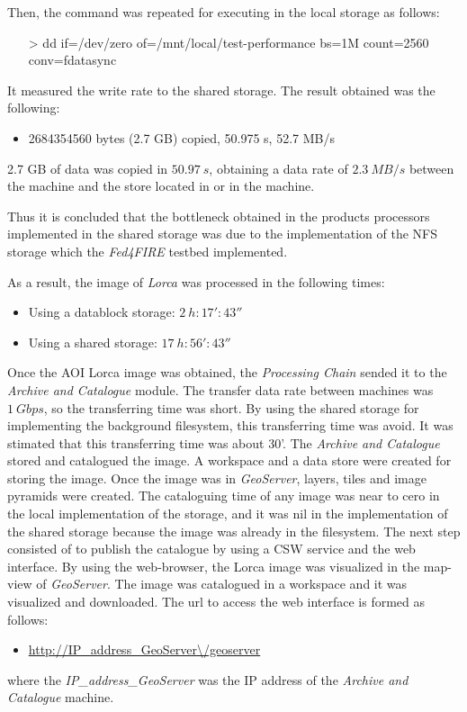 Then, the command was repeated for executing in the local storage as follows:
\begin{itemize}
\item[>] dd if=/dev/zero of=/mnt/local/test-performance bs=1M count=2560
  conv=fdatasync
\end{itemize}

It measured the write rate to the shared storage. The result obtained was the
following:
\begin{itemize}
\item 2684354560 bytes (2.7 GB) copied, 50.975 s, 52.7 MB/s
\end{itemize}
2.7 GB of data was copied in $50.97~s$, obtaining a data rate  of $2.3~MB/s$ between the \bonfire machine and
the store located in  \bonfire or in the machine.

Thus it is concluded that the bottleneck obtained in the products processors
implemented in the shared storage was due to the implementation of the \ac{NFS}
storage which the
\emph{Fed4FIRE} testbed implemented.

As a result, the image of \emph{Lorca} was processed in the following
times:
\begin{itemize}
\item Using a datablock storage: $2~h:17':43''$
\item Using a shared storage: $17~h:56':43''$
\end{itemize}


Once the \ac{AOI} Lorca image was obtained, the \emph{Processing Chain} sended it
to the \emph{Archive and Catalogue} module. The transfer data rate between
\bonfire machines was $1~Gbps$, so the transferring time was short. By using the shared storage for
implementing the background filesystem, this transferring time was avoid. It was
stimated that this transferring time was about 30'. The \emph{Archive
  and Catalogue} stored and catalogued the image. A workspace and a data store
were created for storing the image. Once the image was in \emph{GeoServer},
layers, tiles and image pyramids were created. The cataloguing time of any image
was near to cero in the local implementation of the storage, and it was nil in the implementation of the shared
storage because the image was already in the filesystem. 
The next step consisted of to publish the catalogue by using
a \ac{CSW} service and the web interface. By using the web-browser, the Lorca
image was visualized in the map-view of \emph{GeoServer}. The image was
catalogued in a workspace and it was visualized and downloaded. The url to
access the web interface is formed as follows:
\begin{itemize}
\item \url{http://IP\_address\_GeoServer\/geoserver}
\end{itemize}
where the \emph{IP\_address\_GeoServer} was the \ac{IP} address of the
\emph{Archive and Catalogue} machine.

